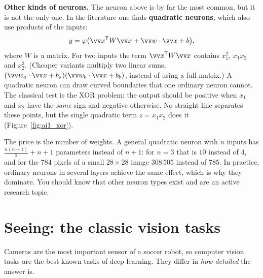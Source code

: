 \textbf{Other kinds of neurons.} The neuron above is by far the most common, but it is not the only one. In the literature one finds \textbf{quadratic neurons}, which also use products of the inputs:
\[
y=\varphi\bigl(\vv x^{\mathsf T}W\vv x+\vv w\cdot\vv x+b\bigr),
\]
where $W$ is a matrix. For two inputs the term $\vv x^{\mathsf T}W\vv x$ contains $x_1^2$, $x_1x_2$ and $x_2^2$. (Cheaper variants multiply two linear sums, $(\vv w_a\cdot\vv x+b_a)(\vv w_b\cdot\vv x+b_b)$, instead of using a full matrix.) A quadratic neuron can draw curved boundaries that one ordinary neuron cannot. The classical test is the XOR problem: the output should be positive when $x_1$ and $x_2$ have the \emph{same} sign and negative otherwise. No straight line separates these points, but the single quadratic term $z=x_1x_2$ does it (Figure~\ref{fig:ai1_xor}).

\begin{center}
\label{fig:ai1_xor}
\end{center}

The price is the number of weights. A general quadratic neuron with $n$ inputs has $\frac{n(n+1)}{2}+n+1$ parameters instead of $n+1$: for $n=3$ that is $10$ instead of $4$, and for the $784$ pixels of a small $28\times28$ image $308\,505$ instead of $785$. In practice, ordinary neurons in several layers achieve the same effect, which is why they dominate. You should know that other neuron types exist and are an active research topic.

\section*{Seeing: the classic vision tasks}
Cameras are the most important sensor of a soccer robot, so computer vision tasks are the best-known tasks of deep learning. They differ in \emph{how detailed} the answer is.

